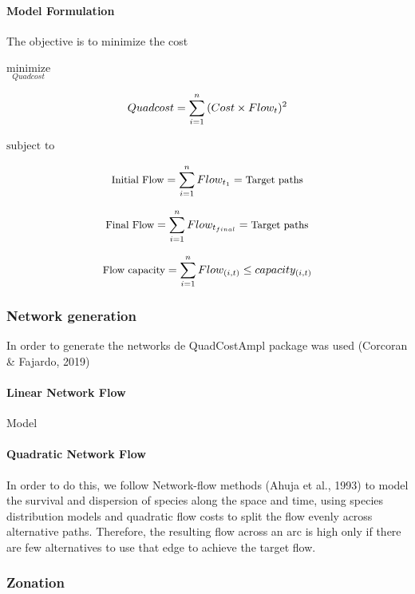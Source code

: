 \documentclass[]{article}
\let\oldparagraph\paragraph
\renewcommand{\paragraph}[1]{\oldparagraph{#1}\mbox{}}
\begin{document}
\hypertarget{model-formulation}{%
\paragraph{Model Formulation}\label{model-formulation}}

The objective is to minimize the cost

\(\underset{Quadcost}{\text{minimize}}\)

\[\small Quadcost =  \sum_{i=1}^n{(Cost\times Flow_t)^2}\]

\(\text{subject to}\)

\[\small \text{Initial Flow} = \sum_{i=1}^n{Flow_{t_1}} = \text{Target paths}\]

\[\small \text{Final Flow} = \sum_{i=1}^n{Flow_{t_{final}}} = \text{Target paths}\]

\[\small \text{Flow capacity} = \sum_{i=1}^n{Flow_{(i,t)}} \leq capacity_{(i,t)}\]

\hypertarget{network-generation}{%
\subsubsection{Network generation}\label{network-generation}}

In order to generate the networks de QuadCostAmpl package was used (Corcoran \& Fajardo, 2019)

\hypertarget{linear-network-flow}{%
\paragraph{Linear Network Flow}\label{linear-network-flow}}

Model

\hypertarget{quadratic-network-flow}{%
\paragraph{Quadratic Network Flow}\label{quadratic-network-flow}}

In order to do this, we follow Network-flow methods (Ahuja et al., 1993) to model the survival and dispersion of species along the space and time, using species distribution models and quadratic flow costs to split the flow evenly across alternative paths. Therefore, the resulting flow across an arc is high only if there are few alternatives to use that edge to achieve the target flow.

\hypertarget{zonation}{%
\subsubsection{Zonation}\label{zonation}}
\end{document}
